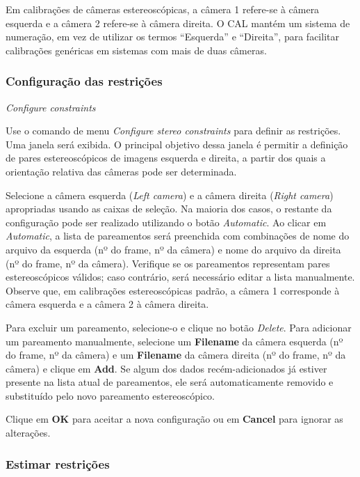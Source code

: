\documentclass[
  12pt,
  letterpaper,
  DIV=11,
  numbers=noendperiod]{scrreprt}
\begin{document}
Em calibrações de câmeras estereoscópicas, a câmera 1 refere-se à câmera
esquerda e a câmera 2 refere-se à câmera direita. O CAL mantém um
sistema de numeração, em vez de utilizar os termos ``Esquerda'' e
``Direita'', para facilitar calibrações genéricas em sistemas com mais
de duas câmeras.

\subsubsection{\texorpdfstring{\textbf{Configuração das
restrições}}{Configuração das restrições}}\label{configurauxe7uxe3o-das-restriuxe7uxf5es-1}

\emph{Configure constraints}

Use o comando de menu \emph{Configure stereo constraints} para definir
as restrições. Uma janela será exibida. O principal objetivo dessa
janela é permitir a definição de pares estereoscópicos de imagens
esquerda e direita, a partir dos quais a orientação relativa das câmeras
pode ser determinada.

Selecione a câmera esquerda (\emph{Left camera}) e a câmera direita
(\emph{Right camera}) apropriadas usando as caixas de seleção. Na
maioria dos casos, o restante da configuração pode ser realizado
utilizando o botão \emph{Automatic}. Ao clicar em \emph{Automatic}, a
lista de pareamentos será preenchida com combinações de nome do arquivo
da esquerda (nº do frame, nº da câmera) e nome do arquivo da direita (nº
do frame, nº da câmera). Verifique se os pareamentos representam pares
estereoscópicos válidos; caso contrário, será necessário editar a lista
manualmente. Observe que, em calibrações estereoscópicas padrão, a
câmera 1 corresponde à câmera esquerda e a câmera 2 à câmera direita.

Para excluir um pareamento, selecione-o e clique no botão \emph{Delete}.
Para adicionar um pareamento manualmente, selecione um \textbf{Filename}
da câmera esquerda (nº do frame, nº da câmera) e um \textbf{Filename} da
câmera direita (nº do frame, nº da câmera) e clique em \textbf{Add}. Se
algum dos dados recém-adicionados já estiver presente na lista atual de
pareamentos, ele será automaticamente removido e substituído pelo novo
pareamento estereoscópico.

Clique em \textbf{OK} para aceitar a nova configuração ou em
\textbf{Cancel} para ignorar as alterações.

\subsubsection{\texorpdfstring{\textbf{Estimar
restrições}}{Estimar restrições}}\label{estimar-restriuxe7uxf5es}
\end{document}
